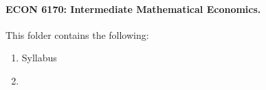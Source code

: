 \documentclass[12pt]{article}
\begin{document}
	
	\paragraph{ECON 6170: Intermediate Mathematical Economics.} This folder contains the following:
	\begin{enumerate}
		\item Syllabus
		\item 
	\end{enumerate}
	
	
	
	
	
	
	
	
	
	
	
	
	
	
	
	
	
	
	
	
	
	
	
\end{document}

